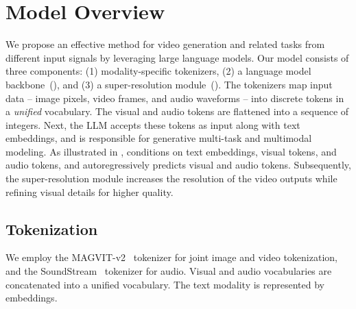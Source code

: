 \vspace{-4mm}
\section{Model Overview} \label{sec:method}
\vspace{-1mm}
We propose an effective method for video generation and related tasks from different input signals by leveraging large language models.
%
Our model consists of three components: (1) modality-specific tokenizers, (2) a language model backbone~(), and (3) a super-resolution module~().
%
The tokenizers map input data -- \ie image pixels, video frames, and audio waveforms -- into discrete tokens in a \emph{unified} vocabulary.
%
The visual and audio tokens are flattened into a sequence of integers.
%
Next, the LLM accepts these tokens as input along with text embeddings, and is responsible for generative multi-task and multimodal modeling. 
%
As illustrated in , \modelname{} conditions on text embeddings, visual tokens, and audio tokens, and autoregressively predicts visual and audio tokens.
%
Subsequently, the super-resolution module increases the resolution of the video outputs while refining visual details for higher quality.

\vspace{-3mm}
\subsection{Tokenization}
\label{sec:tokenization}
\vspace{-2mm}

We employ the MAGVIT-v2~\cite{yu2023language} tokenizer for joint image and video tokenization, and the  SoundStream~\cite{zeghidour2021soundstream} tokenizer for audio. 
%
Visual and audio vocabularies are concatenated into a unified vocabulary. 
The text modality is represented by embeddings. 

\vspace{-4mm}
